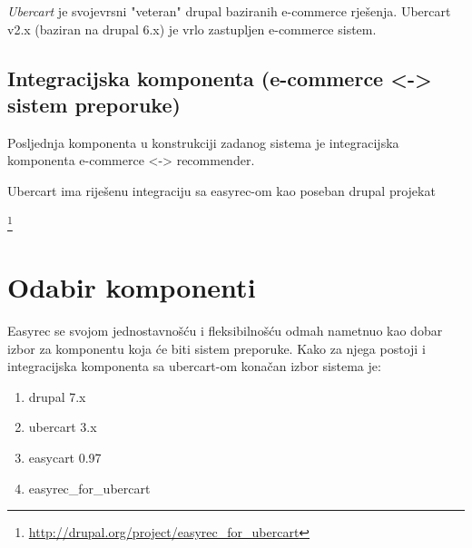 \documentclass[times, utf8, seminar]{fit}
\begin{document}
{\emph{Ubercart} je svojevrsni "veteran" drupal baziranih e-commerce rješenja. Ubercart v2.x (baziran na drupal 6.x) je vrlo zastupljen e-commerce sistem.

\subsection{Integracijska komponenta (e-commerce <-> sistem preporuke)}

Posljednja komponenta u konstrukciji zadanog sistema je integracijska komponenta e-commerce <-> recommender.

Ubercart ima riješenu integraciju sa easyrec-om kao poseban drupal projekat{\footnote{\url{http://drupal.org/project/easyrec\_for\_ubercart}} 

\section{Odabir komponenti}

Easyrec se svojom jednostavnošću i fleksibilnošću odmah nametnuo kao dobar izbor za komponentu koja će biti sistem preporuke. 
Kako za njega postoji i integracijska komponenta sa ubercart-om konačan izbor sistema je:
\begin{enumerate}
  \item drupal 7.x
  \item ubercart 3.x
  \item easycart 0.97
  \item easyrec\_for\_ubercart
\end{enumerate}




}}
\end{document}
